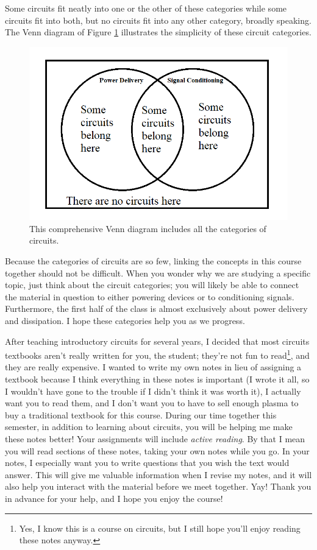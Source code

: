 Some circuits fit neatly into one or the other of these categories while some circuits fit into both, but no circuits fit into any other category, broadly speaking. The Venn diagram of Figure \ref{categoriesVennDiagram} illustrates the simplicity of these circuit categories.
\begin{figure}[h]
\centering
\includegraphics[width=15cm]{figures/vennDiag.png}
\caption{This comprehensive Venn diagram includes all the categories of circuits.}
\label{categoriesVennDiagram}
\end{figure}
\par
Because the categories of circuits are so few, linking the concepts in this course together should not be difficult. When you wonder why we are studying a specific topic, just think about the circuit categories; you will likely be able to connect the material in question to either powering devices or to conditioning signals. Furthermore, the first half of the class is almost exclusively about power delivery and dissipation. I hope these categories help you as we progress.
\par
After teaching introductory circuits for several years, I decided that most circuits textbooks aren't really written for you, the student; they're not fun to read\footnote{Yes, I know this is a course on circuits, but I still hope you'll enjoy reading these notes anyway.}, and they are really expensive. I wanted to write my own notes in lieu of assigning a textbook because I think everything in these notes is important (I wrote it all, so I wouldn't have gone to the trouble if I didn't think it was worth it), I actually want you to read them, and I don't want you to have to sell enough plasma to buy a traditional textbook for this course. During our time together this semester, in addition to learning about circuits, you will be helping me make these notes better! Your assignments will include \textit{active reading}. By that I mean you will read sections of these notes, taking your own notes while you go. In your notes, I especially want you to write questions that you wish the text would answer. This will give me valuable information when I revise my notes, and it will also help you interact with the material before we meet together. Yay! Thank you in advance for your help, and I hope you enjoy the course!